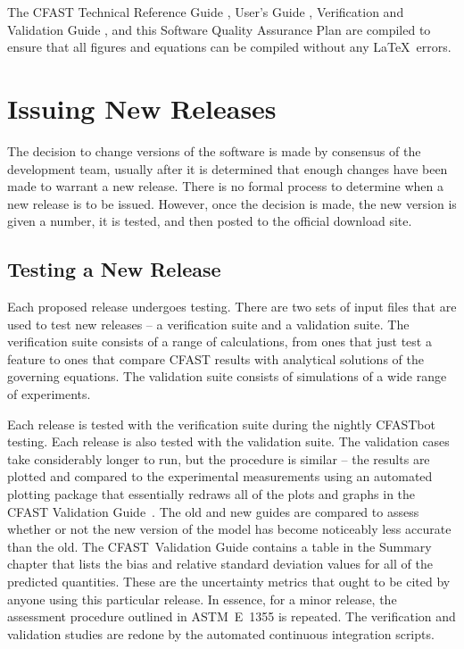 \documentclass[12pt]{book}
\begin{document}
The CFAST Technical Reference Guide \cite{CFAST_Tech_Guide_8}, User's Guide \cite{CFAST_Users_Guide_8}, Verification and Validation Guide \cite{CFAST_Valid_Guide_8}, and this Software Quality Assurance Plan are compiled to ensure that all figures and equations can be compiled without any \LaTeX\ errors.

\section{Issuing New Releases}

The decision to change versions of the software is made by consensus of the development team, usually after it is determined that enough changes have been made to warrant a new release. There is no formal process to determine when a new release is to be issued. However, once the decision is made, the new version is given a number, it is tested, and then posted to the official download site.

\subsection{Testing a New Release}

Each proposed release undergoes testing. There are two sets of input files that are used to test new releases -- a verification suite and a validation suite. The verification suite consists of a range of calculations, from ones that just test a feature to ones that compare CFAST results with analytical solutions of the governing equations. The validation suite consists of simulations of a wide range of experiments.

Each release is tested with the verification suite during the nightly CFASTbot testing. Each release is also tested with the validation suite. The validation cases take considerably longer to run, but the procedure is similar -- the results are plotted and compared to the experimental measurements using an automated plotting package that essentially redraws all of the plots and graphs in the CFAST Validation Guide~\cite{CFAST_Valid_Guide_8}. The old and new guides are compared to assess whether or not the new version of the model has become noticeably less accurate than the old. The CFAST~Validation Guide contains a table in the Summary chapter that lists the bias and relative standard deviation values for all of the predicted quantities. These are the uncertainty metrics that ought to be cited by anyone using this particular  release. In essence, for a minor release, the assessment procedure outlined in ASTM~E~1355 is repeated. The verification and validation studies are redone by the automated continuous integration scripts.
\end{document}
